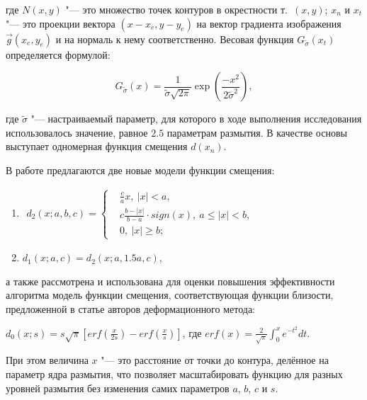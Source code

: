 \noindent где $N\left(x,y\right)$ "--- это множество точек контуров в окрестности т.~$\left(x, y\right)$; $x_n$ и $x_t$ "--- это проекции вектора $\left(x-x_e, y-y_e\right)$ на вектор градиента изображения $\vec{g}\left(x_e,y_e\right)$ и на нормаль к нему соответственно. Весовая функция $G_{\widetilde{\sigma}}\left(x_t\right)$ определяется формулой:

\begin{equation*}
	G_{\widetilde{\sigma}}\left(x\right) = \frac{1}{\widetilde{\sigma} \sqrt{2\pi}} \exp\left(\frac{-x^2}{2\widetilde{\sigma}^2}\right),
\end{equation*}

\noindent где $\widetilde{\sigma}$ "--- настраиваемый параметр, для которого в ходе выполнения исследования использовалось значение, равное $2.5$ параметрам размытия. В качестве основы выступает одномерная функция смещения $d\left(x_n\right)$.

В работе предлагаются две новые модели функции смещения:

\begin{enumerate}[beginpenalty=10000]	
	\item
	$
	\begin{aligned}
		d_2\left(x; a, b, c\right)=\left\{
		\begin{aligned}
			&\frac{c}{a}x,\ \left|x\right|<a,\\
			&c\frac{b-\left|x\right|}{b-a} \cdot sign\left(x\right),\ a\le\left|x\right|<b,\\
			&0,\ \left|x\right|\geq b;
		\end{aligned}
		\right.
	\end{aligned}
	$
	
	\item $d_1\left(x; a, c\right) = d_2\left(x; a, 1.5a, c\right)$,
\end{enumerate}

\noindent а также рассмотрена и использована для оценки повышения эффективности алгоритма модель функции смещения, соответствующая функции близости, предложенной в статье авторов деформационного метода:

$d_0\left(x; s\right)=s\sqrt\pi\left[erf\left(\frac{x}{2s}\right)-erf\left(\frac{x}{s}\right)\right]$, где $erf{\left(x\right)}=\frac{2}{\sqrt\pi}\int_{0}^{x}{e^{-t^2}dt}$.

При этом величина $x$ "--- это расстояние от точки до контура, делённое на параметр ядра размытия, что позволяет масштабировать функцию для разных уровней размытия без изменения самих параметров $a$, $b$, $c$ и $s$.

